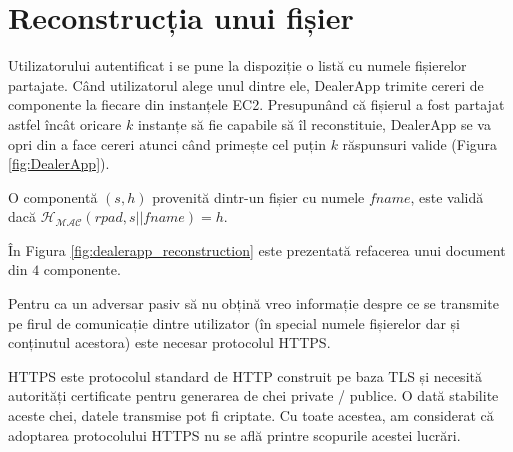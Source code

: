 \documentclass[oneside, 12pt]{book}
\begin{document}

\section{Reconstrucția unui fișier}

Utilizatorului autentificat i se pune la dispoziție o listă cu numele fișierelor partajate. Când utilizatorul alege unul dintre ele, DealerApp trimite cereri de componente la fiecare din instanțele EC2. Presupunând că fișierul a fost partajat astfel încât oricare $k$ instanțe să fie capabile să îl reconstituie, DealerApp se va opri din a face cereri atunci când primește cel puțin $k$ răspunsuri valide (Figura \ref{fig:DealerApp}).

O componentă $(s, h)$ provenită dintr-un fișier cu numele $fname$, este validă dacă $\mathcal{H_{MAC}}(rpad, s || fname) = h$.

În Figura \ref{fig:dealerapp_reconstruction} este prezentată refacerea unui document din $4$ componente.

Pentru ca un adversar pasiv să nu obțină vreo informație despre ce se transmite pe firul de comunicație dintre utilizator (în special numele fișierelor dar și conținutul acestora) este necesar protocolul HTTPS.

HTTPS este protocolul standard de HTTP construit pe baza TLS \cite{dierks2008transport} și necesită autorități certificate pentru generarea de chei private / publice. O dată stabilite aceste chei, datele transmise pot fi criptate. Cu toate acestea, am considerat că adoptarea protocolului HTTPS nu se află printre scopurile acestei lucrări.
\end{document}
